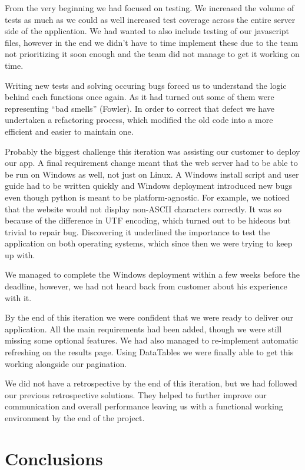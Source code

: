 \documentclass{l3proj}
\begin{document}
From the very beginning we had focused on testing.  We increased the volume of tests as much as we could as well increased test coverage across the entire server side of the application. We had wanted to also include testing of our javascript files, however in the end we didn’t have to time implement these due to the team not prioritizing it soon enough and the team did not manage to get it working on time.

Writing new tests and solving occuring bugs forced us to understand the logic behind each functions once again. As it had turned out some of them were representing ``bad smells'' (Fowler). In order to correct that defect we have undertaken a refactoring process, which modified the old code into a more efficient and easier to maintain one.

Probably the biggest challenge this iteration was assisting our customer to deploy our app. A final requirement change meant that the web server had to be able to be run on Windows as well, not just on Linux. A Windows install script and user guide had to be written quickly and Windows deployment introduced new bugs even though python is meant to be platform-agnostic. For example, we noticed that the website would not display non-ASCII characters correctly. It was so because of the difference in UTF encoding, which turned out to be hideous but trivial to repair bug. Discovering it underlined the importance to test the application on both operating systems, which since then we were trying to keep up with.

We managed to complete the Windows deployment within a few weeks before the deadline, however, we had not heard back from customer about his experience with it. 

By the end of this iteration we were confident that we were ready to deliver our application. All the main requirements had been added, though we were still missing some optional features. We had also managed to re-implement automatic refreshing on the results page. Using DataTables we were finally able to get this working alongside our pagination. 

We did not have a retrospective by the end of this iteration, but we had followed our previous retrospective solutions. They helped to further improve our communication and overall performance leaving us with a functional working environment by the end of the project.

\section{Conclusions}
\end{document}
